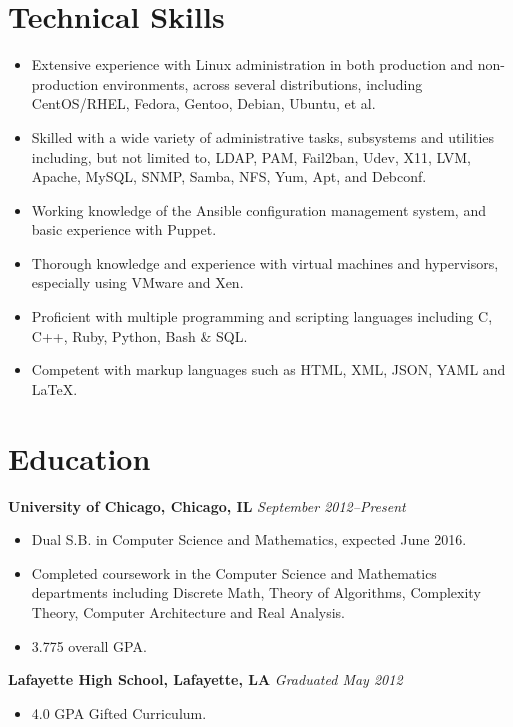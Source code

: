 \documentclass[10pt,letterpaper]{article} %
\begin{document}
    \section*{Technical Skills} 
        \begin{itemize}
        \item Extensive experience with Linux administration in both production and non-production environments, across several distributions, including CentOS/RHEL, Fedora, Gentoo, Debian, Ubuntu, et al.  
	\item Skilled with a wide variety of administrative tasks, subsystems and utilities including, but not limited to, LDAP, PAM, Fail2ban, Udev, X11, LVM, Apache, MySQL, SNMP, Samba, NFS, Yum,  Apt, and Debconf. 
        \item Working knowledge of the Ansible configuration management system, and basic experience with Puppet.
        \item Thorough knowledge and experience with virtual machines and hypervisors, especially using VMware and Xen. 
        \item Proficient with multiple programming and scripting languages including C, C++, Ruby, Python, Bash \& SQL.
        \item Competent with markup languages such as HTML, XML, JSON, YAML and \LaTeX.
        \end{itemize}          
    \section*{Education}
        \textbf{University of Chicago, Chicago, IL } \hfill \textit{ September 2012--Present } 
        \begin{itemize} 
            \item Dual S.B. in Computer Science and Mathematics, expected June 2016. 
            \item Completed coursework in the Computer Science and Mathematics departments including Discrete Math, Theory of Algorithms, Complexity Theory, Computer Architecture and Real Analysis.  
            \item 3.775 overall GPA.
        \end{itemize}
        \textbf{Lafayette High School, Lafayette, LA } \hfill \textit{Graduated May 2012 } 
        \begin{itemize}
           \item 4.0 GPA Gifted Curriculum.
      \end{itemize}
\end{document}
